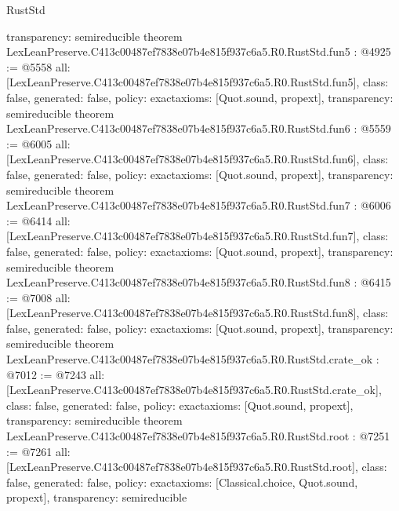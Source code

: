 \begin{lexlean}{RustStd}
\begin{coremodule}
{  transparency: semireducible
}
theorem LexLeanPreserve.C413c00487ef7838e07b4e815f937c6a5.R0.RustStd.fun5 : @4925 := @5558 {
  all: [LexLeanPreserve.C413c00487ef7838e07b4e815f937c6a5.R0.RustStd.fun5],
  class: false,
  generated: false,
  policy: exact{axioms: [Quot.sound, propext]},
  transparency: semireducible
}
theorem LexLeanPreserve.C413c00487ef7838e07b4e815f937c6a5.R0.RustStd.fun6 : @5559 := @6005 {
  all: [LexLeanPreserve.C413c00487ef7838e07b4e815f937c6a5.R0.RustStd.fun6],
  class: false,
  generated: false,
  policy: exact{axioms: [Quot.sound, propext]},
  transparency: semireducible
}
theorem LexLeanPreserve.C413c00487ef7838e07b4e815f937c6a5.R0.RustStd.fun7 : @6006 := @6414 {
  all: [LexLeanPreserve.C413c00487ef7838e07b4e815f937c6a5.R0.RustStd.fun7],
  class: false,
  generated: false,
  policy: exact{axioms: [Quot.sound, propext]},
  transparency: semireducible
}
theorem LexLeanPreserve.C413c00487ef7838e07b4e815f937c6a5.R0.RustStd.fun8 : @6415 := @7008 {
  all: [LexLeanPreserve.C413c00487ef7838e07b4e815f937c6a5.R0.RustStd.fun8],
  class: false,
  generated: false,
  policy: exact{axioms: [Quot.sound, propext]},
  transparency: semireducible
}
theorem LexLeanPreserve.C413c00487ef7838e07b4e815f937c6a5.R0.RustStd.crate_ok : @7012 := @7243 {
  all: [LexLeanPreserve.C413c00487ef7838e07b4e815f937c6a5.R0.RustStd.crate_ok],
  class: false,
  generated: false,
  policy: exact{axioms: [Quot.sound, propext]},
  transparency: semireducible
}
theorem LexLeanPreserve.C413c00487ef7838e07b4e815f937c6a5.R0.RustStd.root : @7251 := @7261 {
  all: [LexLeanPreserve.C413c00487ef7838e07b4e815f937c6a5.R0.RustStd.root],
  class: false,
  generated: false,
  policy: exact{axioms: [Classical.choice, Quot.sound, propext]},
  transparency: semireducible
}


\end{coremodule}
\end{lexlean}
